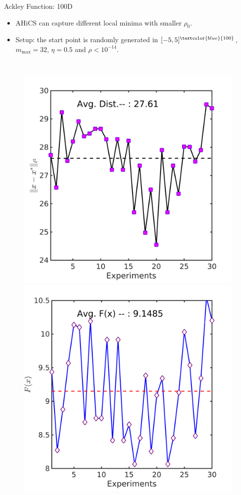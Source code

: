\documentclass{beamer}
\begin{document}
\begin{frame}{Ackley Function: 100D}
\footnotesize{
	\begin{itemize}
		\item AHiCS can capture different local minima with
			smaller $\rho_0$.
		\item Setup: the start point is randomly generated in
			$[-5,5]^{\textcolor{blue}{100}}$, $m_{\max}=32$,
			$\eta=0.5$ and $\rho< 10^{-14}$.
	\end{itemize}
}
\vspace{-0.6cm}
\begin{columns}[c]
	\column{6cm}
\begin{figure}[!htbp]
	\centering
	  \includegraphics[scale=0.1]{./figures/ackley100Drandr0_05_dist.png}
	  \includegraphics[scale=0.1]{./figures/ackley100Drandr0_05_val.png}

\end{figure}
\end{columns}
\end{frame}
\end{document}
